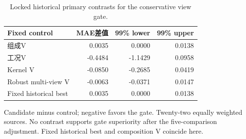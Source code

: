 \begin{table}[htbp]\centering\small
\caption{Locked historical primary contrasts for the conservative view gate.}\label{tab:step9primary}
\begin{tabular}{lrrr}\toprule Fixed control & MAE差值 & 99\% lower & 99\% upper \\ \midrule
组成V & 0.0035 & 0.0000 & 0.0138 \\
工况V & -0.4484 & -1.1429 & 0.0958 \\
Kernel V & -0.0850 & -0.2685 & 0.0419 \\
Robust multi-view V & -0.0063 & -0.0371 & 0.0147 \\
Fixed historical best & 0.0035 & 0.0000 & 0.0138 \\
\bottomrule\end{tabular}\par\smallskip\footnotesize Candidate minus control; negative favors the gate. Twenty-two equally weighted sources. No contrast supports gate superiority after the five-comparison adjustment. Fixed historical best and composition V coincide here.\end{table}
